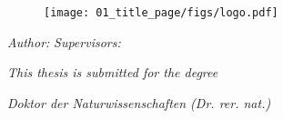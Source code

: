 


\begin{titlepage}
  \thispagestyle{empty}

  \begin{center}
    {\large \theUniversity{}}
    \par {\large \theFaculty{}}
    \par {\large \theDepartment{}}


    \begin{figure}[h]
      \centering
      \texttt{[image: 01\_title\_page/figs/logo.pdf]}
    \end{figure}

    {\huge \textsf{\textbf{\theTitle{}}}}

    \vspace{10mm}

    {\Large \textsf{\textbf{\theThesis{}}}}

    \vspace{15mm}

    \textit{Author:} \hfill \textit{Supervisors:}
    \par {\large \theAuthor{} \hfill \theFirstSupervisor{}}
    \par {\large \hfill \theSecondSupervisor{}}

    \vspace{15mm}

    \textit{This thesis is submitted for the degree}
    \par \textit{\foreignlanguage{ngerman}{
      Doktor der Naturwissenschaften (Dr. rer. nat.)}}

    \vspace{15mm}

    \theDate{}
  \end{center}
\end{titlepage}